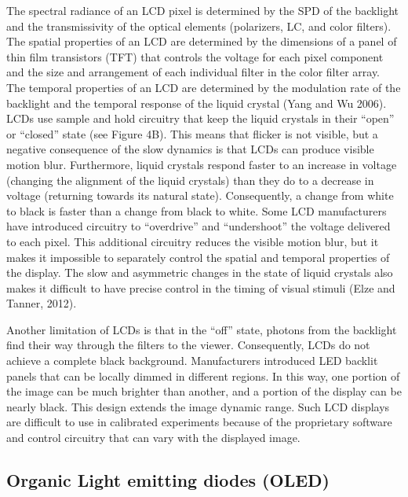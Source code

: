 \documentclass[
  letterpaper,
]{book}
\begin{document}
The spectral radiance of an LCD pixel is determined by the SPD of the
backlight and the transmissivity of the optical elements (polarizers,
LC, and color filters). The spatial properties of an LCD are determined
by the dimensions of a panel of thin film transistors (TFT) that
controls the voltage for each pixel component and the size and
arrangement of each individual filter in the color filter array. The
temporal properties of an LCD are determined by the modulation rate of
the backlight and the temporal response of the liquid crystal (Yang and
Wu 2006). LCDs use sample and hold circuitry that keep the liquid
crystals in their ``open'' or ``closed'' state (see Figure 4B). This
means that flicker is not visible, but a negative consequence of the
slow dynamics is that LCDs can produce visible motion blur. Furthermore,
liquid crystals respond faster to an increase in voltage (changing the
alignment of the liquid crystals) than they do to a decrease in voltage
(returning towards its natural state). Consequently, a change from white
to black is faster than a change from black to white. Some LCD
manufacturers have introduced circuitry to ``overdrive'' and
``undershoot'' the voltage delivered to each pixel. This additional
circuitry reduces the visible motion blur, but it makes it impossible to
separately control the spatial and temporal properties of the display.
The slow and asymmetric changes in the state of liquid crystals also
makes it difficult to have precise control in the timing of visual
stimuli (Elze and Tanner, 2012).

Another limitation of LCDs is that in the ``off'' state, photons from
the backlight find their way through the filters to the viewer.
Consequently, LCDs do not achieve a complete black background.
Manufacturers introduced LED backlit panels that can be locally dimmed
in different regions. In this way, one portion of the image can be much
brighter than another, and a portion of the display can be nearly black.
This design extends the image dynamic range. Such LCD displays are
difficult to use in calibrated experiments because of the proprietary
software and control circuitry that can vary with the displayed image.

\subsection{Organic Light emitting diodes
(OLED)}\label{organic-light-emitting-diodes-oled}
\end{document}
